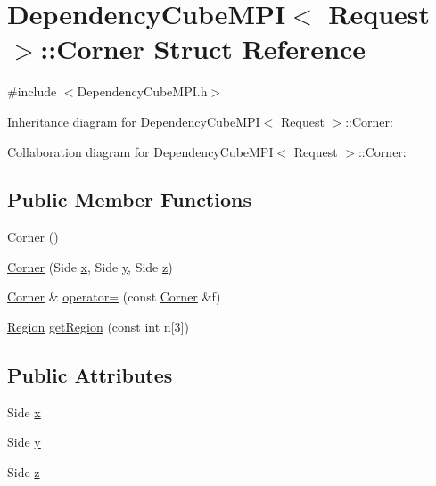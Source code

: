 \hypertarget{struct_dependency_cube_m_p_i_1_1_corner}{}\section{Dependency\+Cube\+M\+P\+I$<$ Request $>$\+:\+:Corner Struct Reference}
\label{struct_dependency_cube_m_p_i_1_1_corner}


{\ttfamily \#include $<$Dependency\+Cube\+M\+P\+I.\+h$>$}



Inheritance diagram for Dependency\+Cube\+M\+P\+I$<$ Request $>$\+:\+:Corner\+:


Collaboration diagram for Dependency\+Cube\+M\+P\+I$<$ Request $>$\+:\+:Corner\+:
\subsection*{Public Member Functions}
\begin{DoxyCompactItemize}
\item 
\hyperlink{struct_dependency_cube_m_p_i_1_1_corner_aaaca0d2df83a56574746366604e29801}{Corner} ()
\item 
\hyperlink{struct_dependency_cube_m_p_i_1_1_corner_acf350554c41d738d9f8a851e3a798e55}{Corner} (Side \hyperlink{struct_dependency_cube_m_p_i_1_1_corner_a941a0145078d057ead36939decc93c67}{x}, Side \hyperlink{struct_dependency_cube_m_p_i_1_1_corner_a76652bdcfac8ac1f4484bf56e1fe06ef}{y}, Side \hyperlink{struct_dependency_cube_m_p_i_1_1_corner_aa9cfcf5cb03be02597c5d1d07fda5e97}{z})
\item 
\hyperlink{struct_dependency_cube_m_p_i_1_1_corner}{Corner} \& \hyperlink{struct_dependency_cube_m_p_i_1_1_corner_a6df8c6c1dc0c16af393a7d71477a6b45}{operator=} (const \hyperlink{struct_dependency_cube_m_p_i_1_1_corner}{Corner} \&f)
\item 
\hyperlink{struct_region}{Region} \hyperlink{struct_dependency_cube_m_p_i_1_1_corner_a73d2edfe56f0d484ff3458758e542b30}{get\+Region} (const int n\mbox{[}3\mbox{]})
\end{DoxyCompactItemize}
\subsection*{Public Attributes}
\begin{DoxyCompactItemize}
\item 
Side \hyperlink{struct_dependency_cube_m_p_i_1_1_corner_a941a0145078d057ead36939decc93c67}{x}
\item 
Side \hyperlink{struct_dependency_cube_m_p_i_1_1_corner_a76652bdcfac8ac1f4484bf56e1fe06ef}{y}
\item 
Side \hyperlink{struct_dependency_cube_m_p_i_1_1_corner_aa9cfcf5cb03be02597c5d1d07fda5e97}{z}
\end{DoxyCompactItemize}


